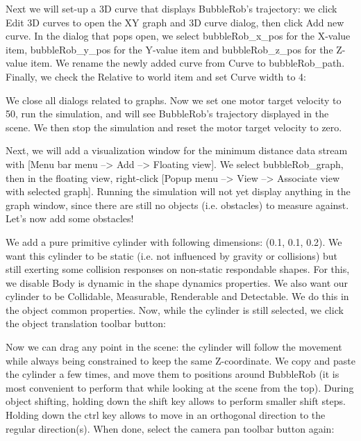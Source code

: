 
Next we will set-up a 3D curve that displays BubbleRob's trajectory: we 
click Edit 3D curves to open the XY graph and 3D curve dialog, then click 
Add new curve. In the dialog that pops open, we select bubbleRob\_x\_pos for
the X-value item, bubbleRob\_y\_pos for the Y-value item and bubbleRob\_z\_pos 
for the Z-value item. We rename the newly added curve from Curve to 
bubbleRob\_path. Finally, we check the Relative to world item and set
Curve width to 4:


We close all dialogs related to graphs. Now we set one motor target 
velocity to 50, run the simulation, and will see BubbleRob's trajectory 
displayed in the scene. We then stop the simulation and reset the motor 
target velocity to zero.

Next, we will add a visualization window for the minimum distance data 
stream with [Menu bar menu --> Add --> Floating view]. We select 
bubbleRob\_graph, then in the floating view, right-click [Popup menu -->
View --> Associate view with selected graph]. Running the simulation will 
not yet display anything in the graph window, since there are still no 
objects (i.e. obstacles) to measure against. Let's now add some obstacles!

We add a pure primitive cylinder with following dimensions: (0.1, 0.1, 0.2).
We want this cylinder to be static (i.e. not influenced by gravity or 
collisions) but still exerting some collision responses on non-static 
respondable shapes. For this, we disable Body is dynamic in the shape 
dynamics properties. We also want our cylinder to be Collidable, 
Measurable, Renderable and Detectable. We do this in the object common 
properties. Now, while the cylinder is still selected, we click the 
object translation toolbar button:


Now we can drag any point in the scene: the cylinder will follow the 
movement while always being constrained to keep the same Z-coordinate. We 
copy and paste the cylinder a few times, and move them to positions around
BubbleRob (it is most convenient to perform that while looking at the scene
from the top). During object shifting, holding down the shift key allows
to perform smaller shift steps. Holding down the ctrl key allows to move 
in an orthogonal direction to the regular direction(s). When done, select
the camera pan toolbar button again:

